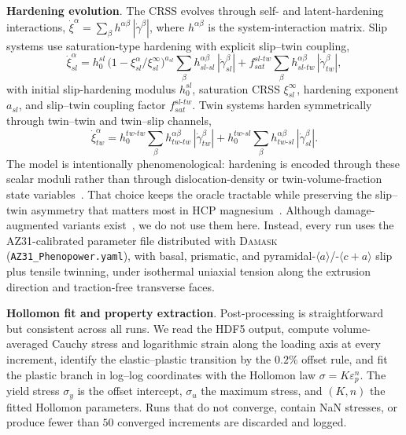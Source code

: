\documentclass{article}
\newcommand{\damask}{\textsc{Damask}}
\newcommand{\sigy}{\sigma_y}
\newcommand{\sigu}{\sigma_u}
\begin{document}
\textbf{Hardening evolution}. The CRSS evolves through self- and latent-hardening interactions,
$\dot\xi^\alpha = \sum_\beta h^{\alpha\beta}\,|\dot\gamma^\beta|$,
where $h^{\alpha\beta}$ is the system-interaction matrix. Slip systems use saturation-type hardening with explicit slip--twin coupling,
\begin{equation}
  \dot\xi^\alpha_{sl} = h_0^{sl}\,\bigl(1 - \xi^\alpha_{sl}/\xi^\infty_{sl}\bigr)^{a_{sl}}\!\sum_\beta h^{\alpha\beta}_{sl\text{-}sl}\,|\dot\gamma^\beta_{sl}|
     + f^{sl\text{-}tw}_{sat}\!\sum_\beta h^{\alpha\beta}_{sl\text{-}tw}\,|\dot\gamma^\beta_{tw}|,
  \label{eq:phenopower-slip-hardening}
\end{equation}
with initial slip-hardening modulus $h_0^{sl}$, saturation CRSS $\xi^\infty_{sl}$, hardening exponent $a_{sl}$, and slip--twin coupling factor $f^{sl\text{-}tw}_{sat}$. Twin systems harden symmetrically through twin--twin and twin--slip channels,
\begin{equation}
  \dot\xi^\alpha_{tw} = h_0^{tw\text{-}tw}\!\sum_\beta h^{\alpha\beta}_{tw\text{-}tw}\,|\dot\gamma^\beta_{tw}|
     + h_0^{tw\text{-}sl}\!\sum_\beta h^{\alpha\beta}_{tw\text{-}sl}\,|\dot\gamma^\beta_{sl}|.
  \label{eq:phenopower-twin-hardening}
\end{equation}
The model is intentionally phenomenological: hardening is encoded through these scalar moduli rather than through dislocation-density or twin-volume-fraction state variables~\citep{Wang2021}. That choice keeps the oracle tractable while preserving the slip--twin asymmetry that matters most in HCP magnesium~\citep{ActaMg2014}. Although damage-augmented variants exist~\citep{FeCrAl2021}, we do not use them here. Instead, every run uses the AZ31-calibrated parameter file distributed with \damask{} (\texttt{AZ31\_Phenopower.yaml}), with basal, prismatic, and pyramidal-$\langle a\rangle$/-$\langle c{+}a\rangle$ slip plus tensile twinning, under isothermal uniaxial tension along the extrusion direction and traction-free transverse faces.

\textbf{Hollomon fit and property extraction}. Post-processing is straightforward but consistent across all runs. We read the HDF5 output, compute volume-averaged Cauchy stress and logarithmic strain along the loading axis at every increment, identify the elastic--plastic transition by the $0.2\%$ offset rule, and fit the plastic branch in log--log coordinates with the Hollomon law $\sigma = K\varepsilon_p^n$. The yield stress $\sigy$ is the offset intercept, $\sigu$ the maximum stress, and $(K,n)$ the fitted Hollomon parameters. Runs that do not converge, contain NaN stresses, or produce fewer than $50$ converged increments are discarded and logged.
\end{document}
